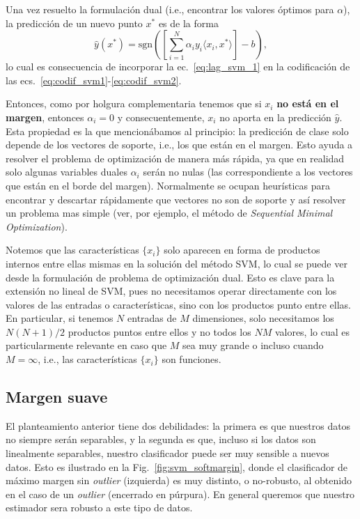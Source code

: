 Una vez resuelto la formulación dual (i.e., encontrar los valores óptimos para $\alpha$), la predicción de un nuevo punto $x^*$ es de la forma 
\begin{equation}
 	\hat{y}(x^*)= \text{sgn}\left(\left[\sum\limits_{i=1}^{N} \alpha_i y_i \langle x_i, x^*\rangle\right] - b\right),
 \end{equation}
 lo cual es consecuencia de incorporar la ec.~\eqref{eq:lag_svm_1} en la codificación de las ecs.~\eqref{eq:codif_svm1}-\eqref{eq:codif_svm2}.

Entonces, como por holgura complementaria tenemos que si $x_i$ \textbf{no está en el margen}, entonces $\alpha_i = 0$ y consecuentemente, $x_i$ no aporta en la predicción $\hat{y}$. Esta propiedad es la que mencionábamos al principio: la predicción de clase solo depende de los vectores de soporte, i.e., los que están en el margen. Esto ayuda a resolver el problema de optimización de manera más rápida, ya que en realidad solo algunas variables duales $\alpha_i$ serán no nulas (las correspondiente a los vectores que están en el borde del margen). Normalmente se ocupan heurísticas para encontrar y descartar rápidamente que vectores no son de soporte y así resolver un problema mas simple (ver, por ejemplo, el método de \emph{Sequential Minimal Optimization}). 


\begin{remark} Notemos que las características $\{x_i\}$ solo aparecen en forma de productos internos entre ellas mismas en la solución del método SVM, lo cual se puede ver desde la formulación de problema de optimización dual. Esto es clave para la extensión no lineal de SVM, pues no necesitamos operar directamente  con los valores de las entradas o características, sino con los productos punto entre ellas. En particular, si tenemos $N$ entradas de $M$ dimensiones, solo necesitamos los $N(N+1)/2$ productos puntos entre ellos y no todos los $NM$ valores, lo cual es particularmente relevante en caso que $M$ sea muy grande o incluso cuando $M=\infty$, i.e., las características $\{x_i\}$ son funciones.
\end{remark} 



\noindent{}


\subsection{Margen suave}

El planteamiento anterior tiene dos debilidades: la primera es que nuestros datos no siempre serán separables, y la segunda es que, incluso si los datos son linealmente separables, nuestro clasificador puede ser muy sensible a nuevos datos. Esto es ilustrado en la Fig.~\ref{fig:svm_softmargin}, donde el clasificador de máximo margen sin \emph{outlier} (izquierda) es muy distinto, o no-robusto, al obtenido en el caso de un \emph{outlier} (encerrado en púrpura). En general queremos que nuestro estimador sera robusto a este tipo de datos. 

